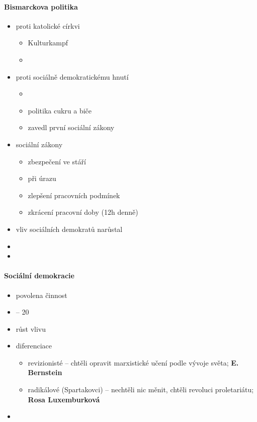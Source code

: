 \paragraph{Bismarckova politika}
\begin{itemize}
\item proti katolické církvi
	\begin{itemize}
	\item Kulturkampf 
	\item {}
	\end{itemize}
\item proti sociálně demokratickému hnutí
	\begin{itemize}
	\item {}
	\item politika cukru a biče
	\item zavedl první sociální zákony
	\end{itemize}
\item sociální zákony
	\begin{itemize}
	\item zbezpečení ve stáří
	\item při úrazu
	\item zlepšení pracovních podmínek
	\item zkrácení pracovní doby (12h denně)
	\end{itemize}
\item vliv sociálních demokratů narůstal
\item {}
\item {}
\end{itemize}

\paragraph{Sociální demokracie}
\begin{itemize}
\item povolena činnost
\item {} -- 20%
\item růst vlivu
\item diferenciace	
	\begin{itemize}
	\item revizionisté -- chtěli opravit marxistické učení podle vývoje světa; \textbf{E. Bernstein}
	\item radikálové (Spartakovci) -- nechtěli nic měnit, chtěli revoluci proletariátu; \textbf{Rosa Luxemburková}
	\end{itemize}
\item {}
\end{itemize}

